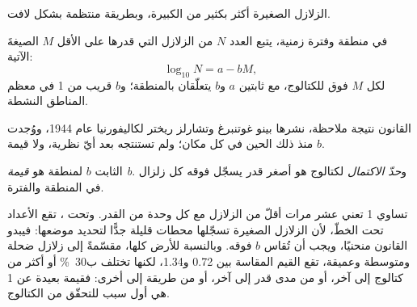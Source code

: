 الزلازل الصغيرة أكثر بكثير من الكبيرة، وبطريقة منتظمة بشكل لافت.

\begin{proposition}\label{prop:b1:earthquake-source:gutenberg-richter}
في منطقة وفترة زمنية، يتبع العدد $N$ من الزلازل التي قدرها على الأقل $M$ الصيغةَ الآتية:
\[
  \log_{10} N = a - bM ,
\]
لكل $M$ فوق  للكتالوج، مع ثابتين $a$ و$b$ يتعلّقان بالمنطقة؛ و$b$ قريب من 1 في معظم المناطق النشطة.
\end{proposition}
\admitted

القانون نتيجة ملاحظة، نشرها بينو غوتنبرغ وتشارلز ريختر لكاليفورنيا عام 1944، ووُجدت منذ ذلك الحين في كل مكان؛ ولم تستنتجه بعد أيّ نظرية، ولا قيمة $b$.

\begin{definition}\label{def:b1:earthquake-source:b-value}
الثابت $b$  لمنطقة هو \emph{قيمة b}. و\emph{حدّ الاكتمال} لكتالوج هو أصغر قدر يسجّل فوقه كل زلزال في المنطقة والفترة.
\end{definition}

 تساوي 1 تعني عشر مرات أقلّ من الزلازل مع كل وحدة من القدر. وتحت ، تقع الأعداد تحت الخطّ، لأن الزلازل الصغيرة تسجّلها محطات قليلة جدًّا لتحديد موضعها: فيبدو القانون منحنيًا، ويجب أن تُقاس $b$ فوقه. وبالنسبة للأرض كلها، مقسّمةً إلى زلازل ضحلة ومتوسطة وعميقة، تقع القيم المقاسة بين 0.72 و\num{1.34}، لكنها تختلف ب\qty{30}{\percent} أو أكثر من كتالوج إلى آخر، أو من مدى قدر إلى آخر، أو من طريقة إلى أخرى: فقيمة بعيدة عن 1 هي أول سبب للتحقّق من الكتالوج.

